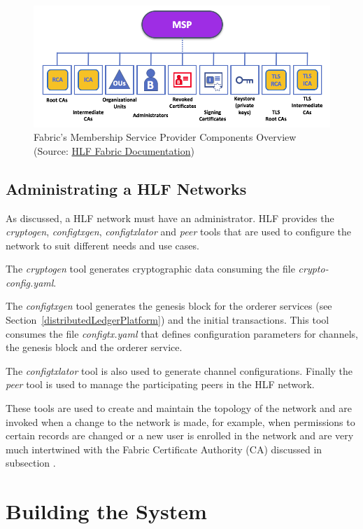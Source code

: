 \begin{figure}[ht] 
  \centering
  \includegraphics[width=0.9\linewidth]{imgs/membershipFabric.png}
  \caption{\label{fig:membershipFabric}Fabric's Membership Service Provider
  Components Overview (Source:
  \href{https://hyperledger-fabric.readthedocs.io/en/release-1.2/ledger/ledger.html}{HLF
  Fabric Documentation})}
\end{figure}

\subsection{Administrating a HLF Networks}

As discussed, a HLF network must have an administrator. HLF provides the
\textit{cryptogen}, \textit{configtxgen}, \textit{configtxlator} and
\textit{peer} tools that are used to configure the network to suit different
needs and use cases.

The \textit{cryptogen} tool generates cryptographic data consuming the file
\textit{crypto-config.yaml}.

The \textit{configtxgen} tool generates the genesis block for the orderer
services (see Section~\ref{distributedLedgerPlatform}) and the initial
transactions.  This tool consumes the file \textit{configtx.yaml} that defines
configuration parameters for channels, the genesis block and the orderer
service.

The \textit{configtxlator} tool is also used to generate channel
configurations.  Finally the \textit{peer} tool is used to manage the
participating peers in the HLF network.

These tools are used to create and maintain the topology of the network and are
invoked when a change to the network is made, for example, when permissions to
certain records are changed or a new user is enrolled in the network and are
very much intertwined with the Fabric Certificate Authority (CA) discussed in
subsection .

\section{Building the System}


